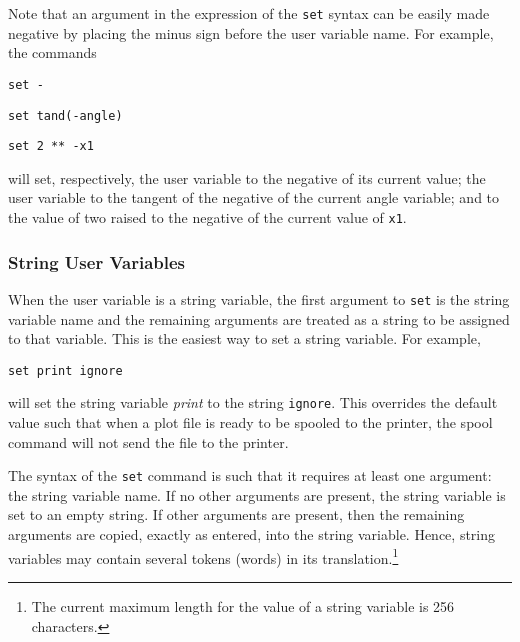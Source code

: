 Note that an argument in the expression of the
{\tt set} syntax
can be easily made negative by placing the minus sign
before the user variable name.
For example, the commands
\begin{wiplist}%
  \item {\tt set  -}
  \item {\tt set  tand(-angle)}
  \item {\tt set  2 ** -x1}
\end{wiplist}
will set, respectively,
the user variable  to the negative of its current value;
the user variable  to the tangent of the negative of the current
angle variable;
and  to the value of two raised to the negative of the current
value of {\tt x1}.

\subsubsection*		{String User Variables}

When the user variable is a string variable, the first argument to {\tt set}
is the string variable name and
the remaining arguments are treated as a string to be assigned to that variable.
This is the easiest way to set a string variable.
For example,
\begin{wiplist}%
  \item {\tt set print ignore}
\end{wiplist}
will set the string variable
{\em print}
to the string {\tt ignore}.
This overrides the default value such that when a plot file
is ready to be spooled to the printer,
the spool command will not send the file to the printer.

The syntax of the {\tt set}
command is such that it requires at least
one argument: the string variable name.
If no other arguments are present,
the string variable is set to an empty string.
If other arguments are present, then the remaining arguments are
copied, exactly as entered, into the string variable.
Hence, string variables may contain several tokens (words) in its
translation.\footnote{The current maximum length for the value
of a string variable is 256 characters.}

